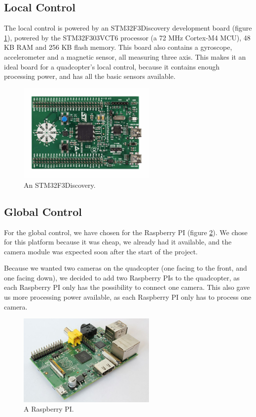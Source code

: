 \documentclass[11pt, a4paper, onecolumn, oneside, parskip=half]{scrartcl}
\begin{document}
\subsection{Local Control}
\label{sec:arch:local}
The local control is powered by an STM32F3Discovery development board (figure \ref{fig:stm32f3}), powered by the STM32F303VCT6 processor (a 72 MHz Cortex-M4 MCU), 48 KB RAM and 256 KB flash memory. This board also contains a gyroscope, accelerometer and a magnetic sensor, all measuring three axis. This makes it an ideal board for a quadcopter's local control, because it contains enough processing power, and has all the basic sensors available.

\begin{figure}[ht]
\centering
\includegraphics[width=0.6\textwidth]{STM32F3DISCOVERY}
\caption{An STM32F3Discovery.}
\label{fig:stm32f3}
\end{figure}

\subsection{Global Control}
\label{sec:arch:global}
For the global control, we have chosen for the Raspberry PI (figure \ref{fig:raspi}). We chose for this platform because it was cheap, we already had it available, and the camera module was expected soon after the start of the project.

Because we wanted two cameras on the quadcopter (one facing to the front, and one facing down), we decided to add two Raspberry PIs to the quadcopter, as each Raspberry PI only has the possibility to connect one camera. This also gave us more processing power available, as each Raspberry PI only has to process one camera.

\begin{figure}[ht]
\centering
\includegraphics[width=0.6\textwidth]{image01}
\caption{A Raspberry PI.}
\label{fig:raspi}
\end{figure}
\end{document}
